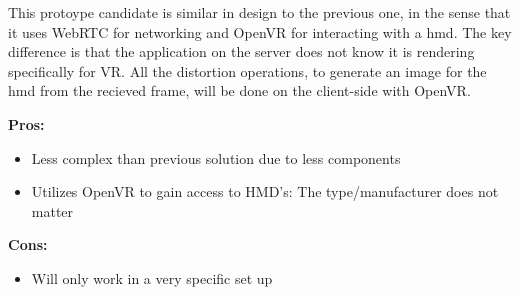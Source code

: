 This protoype candidate is similar in design to the previous one, in the sense that it uses WebRTC for networking and OpenVR for interacting with a \acrshort{hmd}. The key difference is that the application on the server does not know it is rendering specifically for VR. All the distortion operations, to generate an image for the \acrshort{hmd} from the recieved frame, will be done on the client-side with OpenVR. \\
\newline
\begin{varwidth}[t]{.5\textwidth}
\renewcommand\labelitemi{+}
\textbf{Pros:}
\begin{itemize}
\item Less complex than previous solution due to less components 
\item Utilizes OpenVR to gain access to HMD's: The type/manufacturer does not matter
\end{itemize}
\end{varwidth}
\hspace{4em}
\begin{varwidth}[t]{.5\textwidth}
\renewcommand\labelitemi{-}
\textbf{Cons:}
\begin{itemize}
\item Will only work in a very specific set up
\end{itemize}
\end{varwidth}